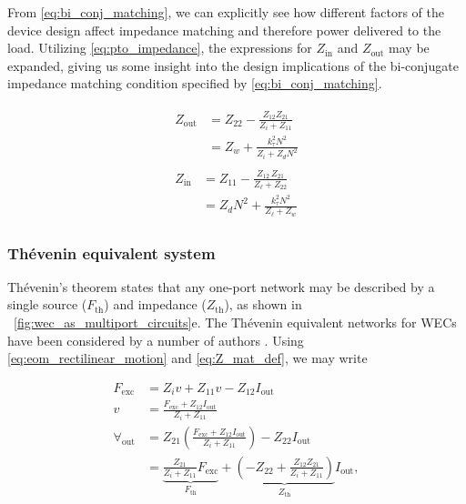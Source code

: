 \documentclass[lettersize,journal]{IEEEtran}
\begin{document}
\noindent{}From \eqref{eq:bi_conj_matching}, we can explicitly see how different factors of the device design affect impedance matching and therefore power delivered to the load.
Utilizing \eqref{eq:pto_impedance}, the expressions for $Z_{\textrm{in}}$ and $Z_{\textrm{out}}$ may be expanded, giving us some insight into the design implications of the bi-conjugate impedance matching condition specified by \eqref{eq:bi_conj_matching}.

\begin{subequations}
\begin{align}
        \begin{split}
                Z_{\textrm{out}} &=  Z_{22} - \frac{Z_{12} Z_{21}}{Z_{i} + Z_{11}} \\[0.5em]
                &=  Z_w + \frac{k_\tau^2 N^2}{Z_i + Z_d N^2}
        \end{split}\label{eq:expanded_zin} \\[1em]
        \begin{split}
                Z_{\textrm{in}} &= Z_{11} - \frac{Z_{12} \, Z_{21}}{Z_\ell + Z_{22}} \\[0.5em]
                &= Z_d N^2 + \frac{k_\tau^2 N^2}{Z_\ell + Z_w}
        \end{split}\label{eq:expanded_zout}
\end{align}\label{eq:expanded_z}
\end{subequations}

\subsubsection{Th\'{e}venin equivalent system}\label{sec:thevenin_equivalent_system}
Th\'{e}venin's theorem \cite{Thevenin:1883aa} states that any one-port network may be described by a single source ($F_{\textrm{th}}$) and impedance ($Z_{\textrm{th}}$), as shown in \figurename~\ref{fig:wec_as_multiport_circuits}e.
The Th\'{e}venin equivalent networks for WECs have been considered by a number of authors \cite{Bacelli:2021aa,Blanco:2019aa,Bubbar:2018aa,Lewis:2013aa}.
Using \eqref{eq:eom_rectilinear_motion} and \eqref{eq:Z_mat_def}, we may write

\begin{equation}
        \nonumber
        \begin{split}
                F_{\textrm{exc}} &= Z_i v + Z_{11} v - Z_{12}I_{\textrm{out}} \\
                v &= \frac{F_{\textrm{exc}} + Z_{12}I_{\textrm{out}} }{Z_i + Z_{11}} \\[0.5em]
                \forall_{\textrm{out}}  &= Z_{21}\left(\frac{F_{\textrm{exc}} + Z_{12}I_{\textrm{out}} }{Z_i + Z_{11}}\right) - Z_{22}I_{\textrm{out}} \\
                &= \underbrace{\frac{Z_{21}}{Z_i + Z_{11}} F_\textrm{exc}}_{F_{\textrm{th}}} + \underbrace{\left( - Z_{22} + \frac{Z_{12}Z_{21}}{Z_i + Z_{11}}\right)}_{Z_\textrm{th}} I_{\textrm{out}} , \\
        \end{split}
\end{equation}
\end{document}
